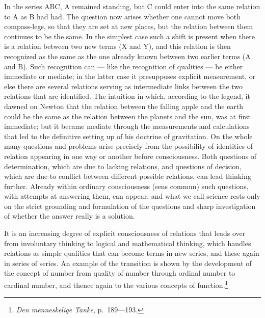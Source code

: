 \documentclass[12pt]{article}
\newcommand{\opage}[1]{\marginnote{\footnotesize\textit{[#1]}}}
\begin{document}
In the series ABC, A remained standing, but C could enter into the same
relation to A as B had had. The question now arises whether one cannot move
both compass-legs, so that they are set at new places, but the relation
between them continues to be the same. In the simplest case \opage{24}such a shift is
present when there is a relation between two new terms (X and Y), and this
relation is then recognized as the same as the one already known between two
earlier terms (A and B). Such recognition can --- like the recognition of
qualities --- be either immediate or mediate; in the latter case it
presupposes explicit measurement, or else there are several relations
serving as intermediate links between the two relations that are identified.
The intuition in which, according to the legend, it dawned on Newton that
the relation between the falling apple and the earth could be the same as
the relation between the planets and the sun, was at first immediate; but it
became mediate through the measurements and calculations that led to the
definitive setting up of his doctrine of gravitation. On the whole many
questions and problems arise precisely from the possibility of identities of
relation appearing in one way or another before consciousness. Both
questions of determination, which are due to lacking relations, and
questions of decision, which are due to conflict between different possible
relations, can lead thinking further. Already within ordinary consciousness
(sens commun) such questions, with attempts at answering them, can appear,
and what we call science rests only on the strict grounding and formulation
of the questions and sharp investigation of whether the answer really is a
solution.

It is an increasing degree of explicit consciousness of relations that leads
over from involuntary thinking to logical and mathematical thinking, which
handles relations as simple qualities that can become terms in new series,
and these again in series of series. An example of the transition is shown
by the development of the concept of number from quality of number through
\opage{25}ordinal number to cardinal number, and thence again to the various concepts
of function.\footnote{\textit{Den menneskelige Tanke}, p.~189---193.}
\end{document}
